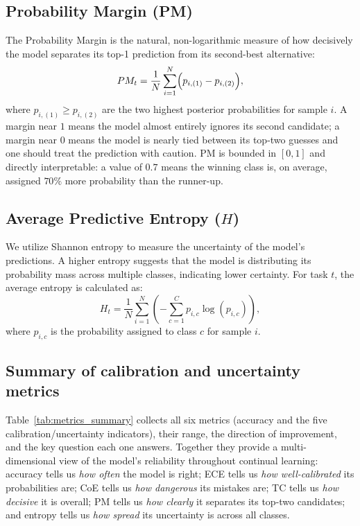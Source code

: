 \subsection{Probability Margin (PM)}

The Probability Margin is the natural, non-logarithmic measure of how decisively the model separates its top-1 prediction from its second-best alternative:
\begin{equation}
	PM_t = \frac{1}{N} \sum_{i=1}^{N} \Bigl( p_{i,(1)} - p_{i,(2)} \Bigr),
\end{equation}
where $p_{i,(1)} \ge p_{i,(2)}$ are the two highest posterior probabilities for sample $i$. A margin near $1$ means the model almost entirely ignores its second candidate; a margin near $0$ means the model is nearly tied between its top-two guesses and one should treat the prediction with caution. PM is bounded in $[0,1]$ and directly interpretable: a value of $0.7$ means the winning class is, on average, assigned $70\%$ more probability than the runner-up.

\subsection{Average Predictive Entropy ($H$)}
We utilize Shannon entropy to measure the uncertainty of the model's predictions. A higher entropy suggests that the model is distributing its probability mass across multiple classes, indicating lower certainty. For task $t$, the average entropy is calculated as:
\begin{equation}
	H_t = \frac{1}{N} \sum_{i=1}^{N} \left( - \sum_{c=1}^{C} p_{i,c} \log(p_{i,c}) \right),
\end{equation}
where $p_{i,c}$ is the probability assigned to class $c$ for sample $i$.

\subsection*{Summary of calibration and uncertainty metrics}

Table~\ref{tab:metrics_summary} collects all six metrics (accuracy and the five calibration/uncertainty indicators), their range, the direction of improvement, and the key question each one answers. Together they provide a multi-dimensional view of the model's reliability throughout continual learning: accuracy tells us \emph{how often} the model is right; ECE tells us \emph{how well-calibrated} its probabilities are; CoE tells us \emph{how dangerous} its mistakes are; TC tells us \emph{how decisive} it is overall; PM tells us \emph{how clearly} it separates its top-two candidates; and entropy tells us \emph{how spread} its uncertainty is across all classes.

